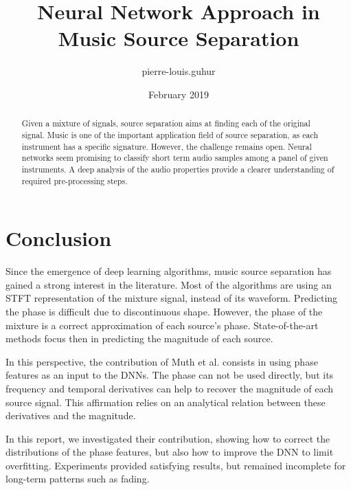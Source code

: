 \documentclass{article}
\title{Neural Network Approach in Music Source Separation}
\author{pierre-louis.guhur }
\date{February 2019}
\begin{document}
\maketitle

\begin{abstract}
    Given a mixture of signals, source separation aims at finding each of the original signal.
    Music is one of the important application field of source separation, as each instrument has a specific signature.
    However, the challenge remains open. Neural networks seem promising to classify short term audio samples among a panel of given instruments.
    A deep analysis of the audio properties provide a clearer understanding of required pre-processing steps.
\end{abstract}







\section{Conclusion}

Since the emergence of deep learning algorithms, music source separation has gained
a strong interest in the literature.
Most of the algorithms are using an STFT representation of the mixture signal,
instead of its waveform.
Predicting the phase is difficult due to discontinuous shape.
However, the phase of the mixture is a correct approximation of each source's phase.
State-of-the-art methods focus then in predicting the magnitude of each source.

In this perspective, the contribution of Muth et al. consists in using phase features
as an input to the DNNs. The phase can not be used directly, but its frequency
and temporal derivatives can help to recover the magnitude of each source signal.
This affirmation relies on an analytical relation between these derivatives and
the magnitude.

In this report, we investigated their contribution, showing how to correct the
distributions of the phase features, but also how to improve the DNN to limit
overfitting. Experiments provided satisfying results, but remained incomplete
for long-term patterns such as fading.


{\small


}
\end{document}
